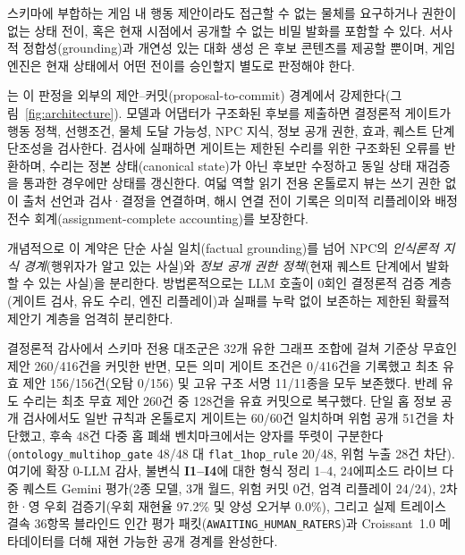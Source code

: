 스키마에 부합하는 게임 내 행동 제안이라도 접근할 수 없는 물체를 요구하거나 권한이 없는 상태 전이, 혹은 현재 시점에서 공개할 수 없는 비밀 발화를 포함할 수 있다. 서사적 정합성(grounding)과 개연성 있는 대화 생성 \cite{S03_weir2024ontologically,S20_ashby2023personalized}은 후보 콘텐츠를 제공할 뿐이며, 게임 엔진은 현재 상태에서 어떤 전이를 승인할지 별도로 판정해야 한다.

\system{}는 이 판정을 외부의 제안--커밋(proposal-to-commit) 경계에서 강제한다(그림~\ref{fig:architecture}). 모델과 어댑터가 구조화된 후보를 제출하면 결정론적 게이트가 행동 정책, 선행조건, 물체 도달 가능성, NPC 지식, 정보 공개 권한, 효과, 퀘스트 단계 단조성을 검사한다. 검사에 실패하면 게이트는 제한된 수리를 위한 구조화된 오류를 반환하며, 수리는 정본 상태(canonical state)가 아닌 후보만 수정하고 동일 상태 재검증을 통과한 경우에만 상태를 갱신한다. 여덟 역할 읽기 전용 온톨로지 뷰는 쓰기 권한 없이 출처 선언과 검사·결정을 연결하며, 해시 연결 전이 기록은 의미적 리플레이와 배정 전수 회계(assignment-complete accounting)를 보장한다.

개념적으로 이 계약은 단순 사실 일치(factual grounding)를 넘어 NPC의 \emph{인식론적 지식 경계}(행위자가 알고 있는 사실)와 \emph{정보 공개 권한 정책}(현재 퀘스트 단계에서 발화할 수 있는 사실)을 분리한다. 방법론적으로는 LLM 호출이 0회인 결정론적 검증 계층(게이트 검사, 유도 수리, 엔진 리플레이)과 실패를 누락 없이 보존하는 제한된 확률적 제안기 계층을 엄격히 분리한다.

결정론적 감사에서 스키마 전용 대조군은 32개 유한 그래프 조합에 걸쳐 기준상 무효인 제안 260/416건을 커밋한 반면, 모든 의미 게이트 조건은 0/416건을 기록했고 최초 유효 제안 156/156건(오탐 0/156) 및 고유 구조 서명 11/11종을 모두 보존했다. 반례 유도 수리는 최초 무효 제안 260건 중 128건을 유효 커밋으로 복구했다. 단일 홉 정보 공개 검사에서도 일반 규칙과 온톨로지 게이트는 60/60건 일치하며 위험 공개 51건을 차단했고, 후속 48건 다중 홉 폐쇄 벤치마크에서는 양자를 뚜렷이 구분한다(\texttt{ontology\_}\allowbreak\texttt{multihop\_}\allowbreak\texttt{gate} 48/48 대 \texttt{flat\_}\allowbreak\texttt{1hop\_}\allowbreak\texttt{rule} 20/48, 위험 누출 28건 차단). 여기에 확장 0-LLM 감사, 불변식 \textbf{I1--I4}에 대한 형식 정리 1--4, 24에피소드 라이브 다중 퀘스트 Gemini 평가(2종 모델, 3개 월드, 위험 커밋 0건, 엄격 리플레이 24/24), 2차 한·영 우회 검증기(우회 재현율 97.2\% 및 양성 오거부 0.0\%), 그리고 실제 트레이스 결속 36항목 블라인드 인간 평가 패킷(\texttt{AWAITING\_}\allowbreak\texttt{HUMAN\_}\allowbreak\texttt{RATERS})과 Croissant~1.0 메타데이터를 더해 재현 가능한 공개 경계를 완성한다.

